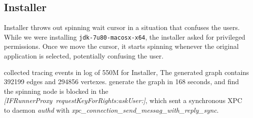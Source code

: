\subsection{Installer}
Installer throws out spinning wait cursor in a situation
that confuses the users.
While we were installing \texttt{jdk-7u80-macosx-x64}, the installer
asked for privileged permissions.
Once we move the cursor, it starts spinning whenever the
original application is selected, potentially confusing the user.

\xxx collected tracing events in log of 550M for Installer,
The generated graph contains 392199 edges and 294856 vertexes.
\xxx generate the graph in 168 seconds, and find the spinning
node is blocked in the \textit{[IFRunnerProxy\ requestKeyForRights:askUser:]},
which sent a synchronous XPC to daemon \textit{authd} with
\textit{xpc\_connection\_send\_messag\_with\_reply\_sync}.
